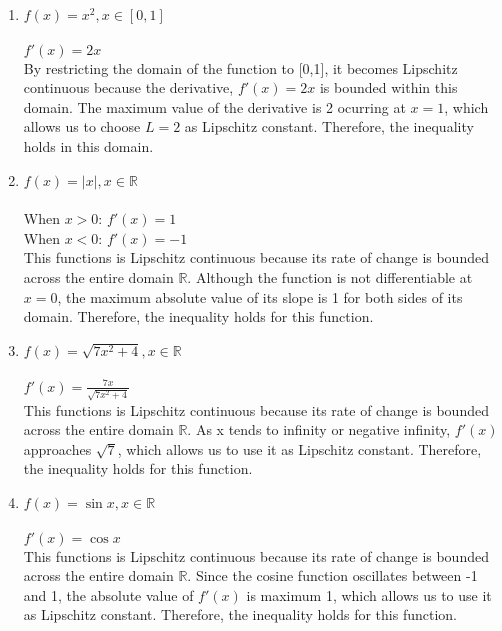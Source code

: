 \documentclass{assignment}
\newcommand{\R}{\mathbb{R}}
\begin{document}
\begin{problem}
\begin{enumerate}
\begin{enumerate}
    \item $f(x) = x^2, x \in [0,1]$\\\\
    $f'(x) = 2x$\\

    By restricting the domain of the function to [0,1], it becomes Lipschitz continuous because the derivative, $f'(x) = 2x$ is bounded within this domain. The maximum value of the derivative is 2 ocurring at $x=1$, which allows us to choose $L=2$ as Lipschitz constant. Therefore, the inequality holds in this domain.\\

    \item $f(x) = |x|, x \in \R$\\\\
    When $x>0$:
    $f'(x) = 1$\\

    When $x<0$:
    $f'(x) = -1$\\

    This functions is Lipschitz continuous because its rate of change is bounded across the entire domain $\R$. Although the function is not differentiable at $x=0$, the maximum absolute value of its slope is 1 for both sides of its domain. Therefore, the inequality holds for this function.\\

    \item $f(x) = \sqrt{7x^2 + 4}, x\in\R$\\\\
    $f'(x) = \frac{7x}{\sqrt{7x^2+4}}$\\

    This functions is Lipschitz continuous because its rate of change is bounded across the entire domain $\R$. As x tends to infinity or negative infinity, $f'(x)$ approaches $\sqrt{7}$, which allows us to use it as Lipschitz constant. Therefore, the inequality holds for this function.\\

    \item $f(x) = \sin x, x\in\R$\\\\
    $f'(x) = \cos x$\\

    This functions is Lipschitz continuous because its rate of change is bounded across the entire domain $\R$. Since the cosine function oscillates between -1 and 1, the absolute value of $f'(x)$ is maximum 1, which allows us to use it as Lipschitz constant. Therefore, the inequality holds for this function.\\


\end{enumerate}
\end{enumerate}
\end{problem}
\end{document}
